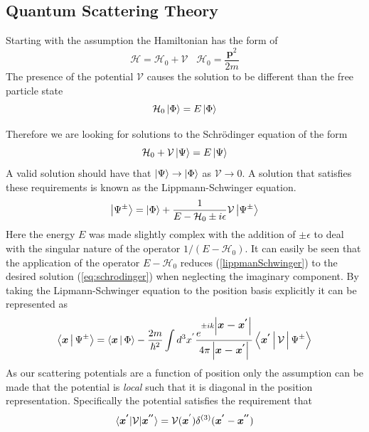 \subsection{Quantum Scattering Theory}
\label{sec:scatteringTheory}
 Starting with the assumption the Hamiltonian has the form of 
 \begin{equation}
 \mathcal{H} = \mathcal{H}_0+\mathcal{V} \,\,\,\,\, \mathcal{H}_0= \frac{\textbf{p}^2}{2m}
 \label{eq:hamiltonian}
 \end{equation}
The presence of the potential $\mathcal{V}$ causes the solution to be different than the free particle state 
$$\mathcal{H}_0\Ket{\Phi}=E\Ket{\Phi}$$

Therefore we are looking for solutions to the Schrödinger equation of the form 
\begin{equation}
\label{eq:schrodinger}
\mathcal{H}_0+\mathcal{V}\Ket{\Psi} = E\Ket{\Psi} 
\end{equation} 
 A valid solution should have that $\Ket{\Psi}\rightarrow\Ket{\Phi}$ as $\mathcal{V}\rightarrow 0$. A solution that satisfies these requirements is known as the Lippmann-Schwinger equation. 
 \begin{equation}
 	\label{lippmanSchwinger}
 	\Ket{\Psi^{\pm}}=\Ket{\Phi}+\frac{1}{E-\mathcal{H}_0\pm i\epsilon}\mathcal{V}\Ket{\Psi^{\pm}} 
 \end{equation}
 Here the energy $E$ was made slightly complex with the addition of $\pm \epsilon$ to deal with the singular nature of the operator $1/(E-\mathcal{H}_0)$. It can easily be seen that the application of the operator $E-\mathcal{H}_0$ reduces (\ref{lippmanSchwinger}) to the desired solution (\ref{eq:schrodinger}) when neglecting the imaginary component. By taking the Lipmann-Schwinger equation to the position basis explicitly it can be represented as 
 \begin{equation}
 \label{eq:positionBasis}
 \Braket{\mbox{\boldmath$x$}|\Psi^{\pm}}=\Braket{\mbox{\boldmath$x$}|\Phi} -\frac{2m}{\hbar^2} \int d^3x^{'} \frac{e^{\pm ik\left|\mbox{\boldmath$x-x^{'}$}\right|}}{ 4\pi \left| \mbox{\boldmath$x-x^{'}$} \right|} \Braket{\mbox{\boldmath$x^{'}$}|\mathcal{V}|\Psi^{\pm}}
 \end{equation}
As our scattering potentials are a function of position only the assumption can be made that the potential is \textit{local} such that it is diagonal in the position representation. Specifically the potential satisfies the requirement that 
\begin{equation}
\label{eq:localPotential}
\braket{\mbox{\boldmath$x^{'}$}|\mathcal{V}|\mbox{\boldmath$x^{''}$}}=\mathcal{V}(\mbox{\boldmath$x$}^{'})\delta^{(3)}(\mbox{\boldmath$x^{'}$}-\mbox{\boldmath$x^{''}$})
\end{equation}

